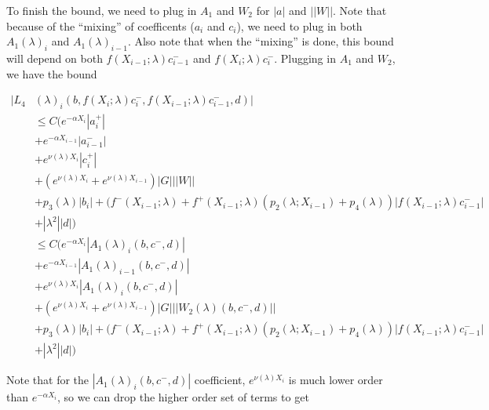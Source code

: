 \documentclass[12pt]{article}
\begin{document}
\begin{enumerate}
To finish the bound, we need to plug in $A_1$ and $W_2$ for $|a|$ and $||W||$. Note that because of the ``mixing'' of coefficents ($a_i$ and $c_i$), we need to plug in both $A_1(\lambda)_i$ and $A_1(\lambda)_{i-1}$. Also note that when the ``mixing'' is done, this bound will depend on both $f(X_{i-1}; \lambda) c_{i-1}^-$ and $f(X_i; \lambda) c_i^-$. Plugging in $A_1$ and $W_2$, we have the bound

\begin{align*}
|L_4&(\lambda)_i(b, f(X_i; \lambda) c_i^-, f(X_{i-1}; \lambda) c_{i-1}^-, d)|\\ 
&\leq C\Big( e^{-\alpha X_i} |a_i^+| \\
&+  e^{-\alpha X_{i-1}} |a_{i-1}^-| \\
&+ e^{\nu(\lambda)X_{i}} |c_i^+| \\
&+ (e^{\nu(\lambda)X_i} + e^{\nu(\lambda)X_{i-1}}) |G| ||W|| \\
&+ p_3(\lambda) |b_i| + (f^-(X_{i-1}; \lambda) + f^+(X_{i-1}; \lambda) (p_2(\lambda; X_{i-1}) + p_4(\lambda)) | f(X_{i-1}; \lambda) c_{i-1}^-| \\
&+|\lambda^2| |d| \Big) \\
&\leq C\Big( e^{-\alpha X_i} |A_1(\lambda)_i(b, c^-, d)| \\
&+  e^{-\alpha X_{i-1}} |A_1(\lambda)_{i-1}(b, c^-, d)| \\
&+ e^{\nu(\lambda)X_{i}} |A_1(\lambda)_i(b, c^-, d)|  \\
&+ (e^{\nu(\lambda)X_i} + e^{\nu(\lambda)X_{i-1}}) |G| ||W_2(\lambda)(b,c^-,d)|| \\
&+ p_3(\lambda) |b_i| + (f^-(X_{i-1}; \lambda) + f^+(X_{i-1}; \lambda) (p_2(\lambda; X_{i-1}) + p_4(\lambda)) | f(X_{i-1}; \lambda) c_{i-1}^-| \\
&+|\lambda^2| |d| \Big)
\end{align*}

Note that for the $|A_1(\lambda)_i(b, c^-, d)|$ coefficient, $e^{\nu(\lambda)X_{i}}$ is much lower order than $e^{-\alpha X_i}$, so we can drop the higher order set of terms to get


\end{enumerate}
\end{document}
